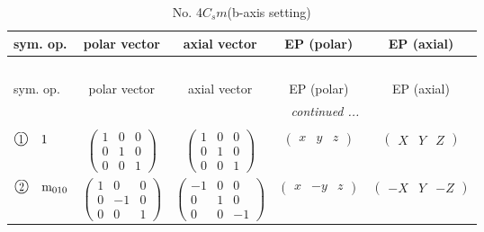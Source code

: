 \documentclass[fleqn,10pt,landscape]{jsarticle}
\begin{document}
\newpage
\begin{center}
\renewcommand{\arraystretch}{1.3}
\begin{longtable}{lcccc}
\caption{No. 4\quad$C_{s}$\quad$m$\quad(b-axis setting)\quad[ monoclinic ]}
 \\
 \hline \hline
sym. op. & polar vector & axial vector & EP (polar) & EP (axial) \\ \hline \endfirsthead

\multicolumn{4}{l}{\tablename\ \thetable{}} \\
 \hline \hline
sym. op. & polar vector & axial vector & EP (polar) & EP (axial) \\ \hline \endhead

 \hline \hline
\multicolumn{4}{r}{\footnotesize\it continued ...} \\ \endfoot

 \hline \hline
\multicolumn{4}{r}{} \\ \endlastfoot

$ {\ooalign{\hfil\resizebox{.8\width}{\height}{1}\hfil\crcr\raise.1ex\hbox{\large$\bigcirc$}}}\quad 1 $ & $ \begin{pmatrix} 1 & 0 & 0 \\ 0 & 1 & 0 \\ 0 & 0 & 1 \end{pmatrix} $ & $ \begin{pmatrix} 1 & 0 & 0 \\ 0 & 1 & 0 \\ 0 & 0 & 1 \end{pmatrix} $ & $ \begin{pmatrix} x & y & z \end{pmatrix} $ & $ \begin{pmatrix} X & Y & Z \end{pmatrix} $ \\
$ {\ooalign{\hfil\resizebox{.8\width}{\height}{2}\hfil\crcr\raise.1ex\hbox{\large$\bigcirc$}}}\quad {\rm m}_{010} $ & $ \begin{pmatrix} 1 & 0 & 0 \\ 0 & -1 & 0 \\ 0 & 0 & 1 \end{pmatrix} $ & $ \begin{pmatrix} -1 & 0 & 0 \\ 0 & 1 & 0 \\ 0 & 0 & -1 \end{pmatrix} $ & $ \begin{pmatrix} x & - y & z \end{pmatrix} $ & $ \begin{pmatrix} - X & Y & - Z \end{pmatrix} $ \\
\end{longtable}
\end{center}
\end{document}
